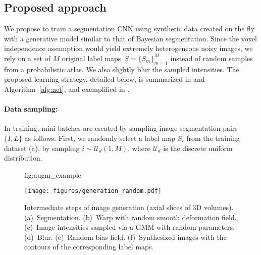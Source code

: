 \documentclass{midl}
\begin{document}
\subsection{Proposed approach}
\label{sec:approach}

We propose to train a segmentation CNN using synthetic data created on the fly with a generative model similar to that of Bayesian segmentation. Since the voxel independence assumption would yield extremely heterogeneous noisy images, we rely on a set of $M$ original label maps~$S=\{S_m\}_{m=1}^M$ instead of random samples from a probabilistic atlas. We also slightly blur the sampled intensities. The proposed learning strategy, detailed below, is summarized in  and Algorithm~\ref{alg:net}, and exemplified in . \newline

\paragraph{Data sampling:} In training, mini-batches are created  by sampling image-segmentation pairs~$\{I,L\}$ as follows. First, we randomly select a label map $S_i$ from the training dataset (a), by sampling $i \sim \mathcal{U}_d(1,M)$, where $\mathcal{U}_d$ is the discrete uniform distribution. 

\begin{figure}[t]
\centering
\floatconts
  {fig:augm_example}
  {
  \caption{Intermediate steps of image generation (axial slices of 3D volumes). (a)~Segmentation. (b)~Warp with random smooth deformation field. (c)~Image intensities sampled via a GMM with random parameters. (d)~Blur. (e)~Random  bias field. (f)~Synthesized images with the contours of the corresponding label maps.}}
  {\texttt{[image: figures/generation\_random.pdf]}}
\end{figure}
\end{document}
